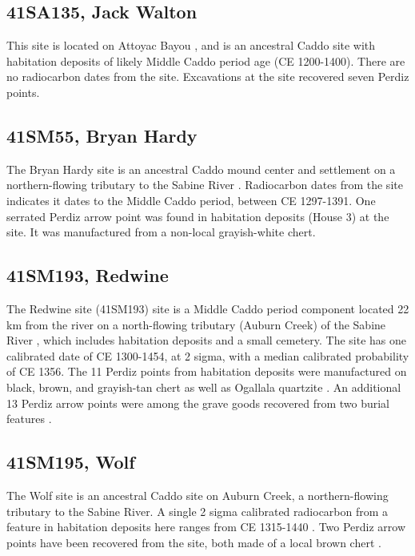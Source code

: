 \documentclass[review]{elsarticle}
\begin{document}
\subsection*{41SA135, Jack Walton}

This site is located on Attoyac Bayou \citep{RN1971}, and is an ancestral Caddo site with habitation deposits of likely Middle Caddo period age (CE 1200-1400). There are no radiocarbon dates from the site. Excavations at the site recovered seven Perdiz points.

\subsection*{41SM55, Bryan Hardy}

The Bryan Hardy site is an ancestral Caddo mound center and settlement on a northern-flowing tributary to the Sabine River \citep{RN3231}. Radiocarbon dates from the site indicates it dates to the Middle Caddo period, between CE 1297-1391. One serrated Perdiz arrow point was found in habitation deposits (House 3) at the site. It was manufactured from a non-local grayish-white chert.

\subsection*{41SM193, Redwine}

The Redwine site (41SM193) site is a Middle Caddo period component located 22 km from the river on a north-flowing tributary (Auburn Creek) of the Sabine River \citep{RN3230}, which includes habitation deposits and a small cemetery. The site has one calibrated date of CE 1300-1454, at 2 sigma, with a median calibrated probability of CE 1356. The 11 Perdiz points from habitation deposits were manufactured on black, brown, and grayish-tan chert as well as Ogallala quartzite \citep[14]{RN3230}. An additional 13 Perdiz arrow points were among the grave goods recovered from two burial features \citep[35]{RN3230}.

\subsection*{41SM195, Wolf}

The Wolf site is an ancestral Caddo site on Auburn Creek, a northern-flowing tributary to the Sabine River. A single 2 sigma calibrated radiocarbon from a feature in habitation deposits here ranges from CE 1315-1440 \citep{RN3220}. Two Perdiz arrow points have been recovered from the site, both made of a local brown chert \citep[4,5,Figure 8]{RN3220}.
\end{document}

